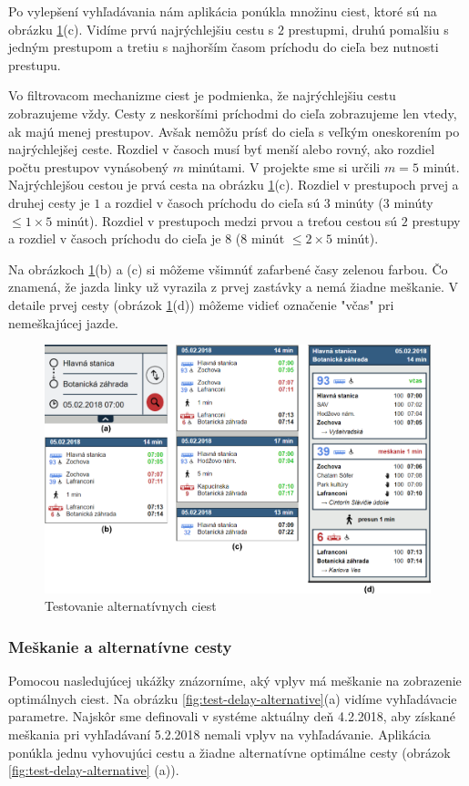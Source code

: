 Po vylepšení vyhľadávania nám aplikácia ponúkla množinu ciest, ktoré sú na obrázku \ref{fig:test-alternative}(c). Vidíme prvú najrýchlejšiu cestu s $2$ prestupmi, druhú pomalšiu s jedným prestupom a tretiu s najhorším časom príchodu do cieľa bez nutnosti prestupu. 

Vo filtrovacom mechanizme ciest je podmienka, že najrýchlejšiu cestu zobrazujeme vždy. Cesty z neskoršími príchodmi do cieľa zobrazujeme len vtedy, ak majú menej prestupov. Avšak nemôžu prísť do cieľa s veľkým oneskorením po najrýchlejšej ceste. Rozdiel v časoch musí byť menší alebo rovný, ako rozdiel počtu prestupov vynásobený $m$ minútami. V projekte sme si určili $m = 5$ minút. Najrýchlejšou cestou je prvá cesta na obrázku \ref{fig:test-alternative}(c). Rozdiel v prestupoch prvej a druhej cesty je $1$ a rozdiel v časoch príchodu do cieľa sú $3$ minúty ($3$ minúty $\leq 1\times5$ minút).
Rozdiel v prestupoch medzi prvou a treťou cestou sú $2$ prestupy a rozdiel v časoch príchodu do cieľa je $8$ ($8$ minút $\leq 2\times5$ minút).

Na obrázkoch \ref{fig:test-alternative}(b) a (c) si môžeme všimnúť zafarbené časy zelenou farbou. Čo znamená, že jazda linky už vyrazila z prvej zastávky a nemá žiadne meškanie. V detaile prvej cesty (obrázok \ref{fig:test-alternative}(d)) môžeme vidieť označenie "včas" pri nemeškajúcej jazde.

\begin{figure}[H]
\centerline{\includegraphics[width=1.0\textwidth]{images/test/alternative}}
\caption[Testovanie alternatívnych ciest]{Testovanie alternatívnych ciest}
\label{fig:test-alternative}
\end{figure}

\subsubsection{Meškanie a alternatívne cesty}
Pomocou nasledujúcej ukážky znázorníme, aký vplyv má meškanie na zobrazenie optimálnych ciest. Na obrázku \ref{fig:test-delay-alternative}(a) vidíme vyhľadávacie parametre. Najskôr sme definovali v systéme aktuálny deň 4.2.2018, aby získané meškania pri vyhľadávaní 5.2.2018 nemali vplyv na vyhľadávanie. Aplikácia ponúkla jednu vyhovujúci cestu a žiadne alternatívne optimálne cesty (obrázok \ref{fig:test-delay-alternative} (a)). 

